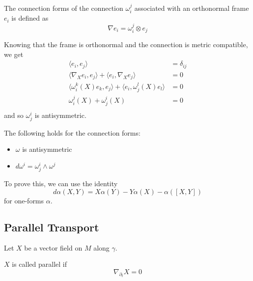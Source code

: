 \documentclass[../main.tex]{subfiles}
\begin{document}
\begin{defn}
    The connection forms of the connection $\omega_i^j$ associated with an
    orthonormal frame $e_i$ is defined as
    \[
        \nabla e_i = \omega_i^j\otimes e_j
    \]
\end{defn}

Knowing that the frame is orthonormal and the connection is metric compatible,
we get
\[
    \begin{aligned}
        \langle e_i, e_j\rangle &= \delta_{ij}\\
        \langle \nabla_Xe_i,e_j\rangle + \langle e_i,\nabla_Xe_j\rangle &=0\\
        \langle \omega_i^k(X)e_k, e_j\rangle + \langle e_i,
        \omega_j^l(X)e_l\rangle &= 0\\
        \omega_i^j(X) + \omega^i_j(X) &= 0\\
    \end{aligned}
\]
and so $\omega^i_j$ is antisymmetric.

\begin{theorem}
    The following holds for the connection forms:
    \begin{itemize}
        \item $\omega$ is antisymmetric
        \item $d\omega^i = \omega_j^i\wedge\omega^j$
    \end{itemize}
\end{theorem}

To prove this, we can use the identity
\[
    d\alpha(X,Y) = X\alpha(Y) -Y\alpha(X) - \alpha([X,Y])
\]
for one-forms $\alpha$.

\subsection{Parallel Transport}
Let $X$ be a vector field on $M$ along $\gamma$.
\begin{defn}
    $X$ is called parallel if
    \[
        \nabla_{\partial_t}X=0
    \]
\end{defn}
\end{document}
